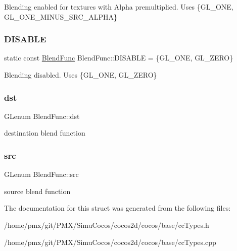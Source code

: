 Blending enabled for textures with Alpha premultiplied. Uses \{G\+L\+\_\+\+O\+NE, G\+L\+\_\+\+O\+N\+E\+\_\+\+M\+I\+N\+U\+S\+\_\+\+S\+R\+C\+\_\+\+A\+L\+P\+HA\} \mbox{\label{structBlendFunc_ad9011b05987e4f4583581272c0dbc4ed}} 
\subsubsection{\texorpdfstring{D\+I\+S\+A\+B\+LE}{DISABLE}}
{\footnotesize\ttfamily static const \hyperlink{structBlendFunc}{Blend\+Func} Blend\+Func\+::\+D\+I\+S\+A\+B\+LE = \{G\+L\+\_\+\+O\+NE, G\+L\+\_\+\+Z\+E\+RO\}\hspace{0.3cm}{\ttfamily [static]}}

Blending disabled. Uses \{G\+L\+\_\+\+O\+NE, G\+L\+\_\+\+Z\+E\+RO\} \mbox{\label{structBlendFunc_ac56cb2239f7e360e27ce4d5f103317ad}} 
\subsubsection{\texorpdfstring{dst}{dst}}
{\footnotesize\ttfamily G\+Lenum Blend\+Func\+::dst}

destination blend function \mbox{\label{structBlendFunc_a33bdda136b902748def90799d57dba69}} 
\subsubsection{\texorpdfstring{src}{src}}
{\footnotesize\ttfamily G\+Lenum Blend\+Func\+::src}

source blend function 

The documentation for this struct was generated from the following files\+:\begin{DoxyCompactItemize}
\item 
/home/pmx/git/\+P\+M\+X/\+Simu\+Cocos/cocos2d/cocos/base/cc\+Types.\+h\item 
/home/pmx/git/\+P\+M\+X/\+Simu\+Cocos/cocos2d/cocos/base/cc\+Types.\+cpp\end{DoxyCompactItemize}
